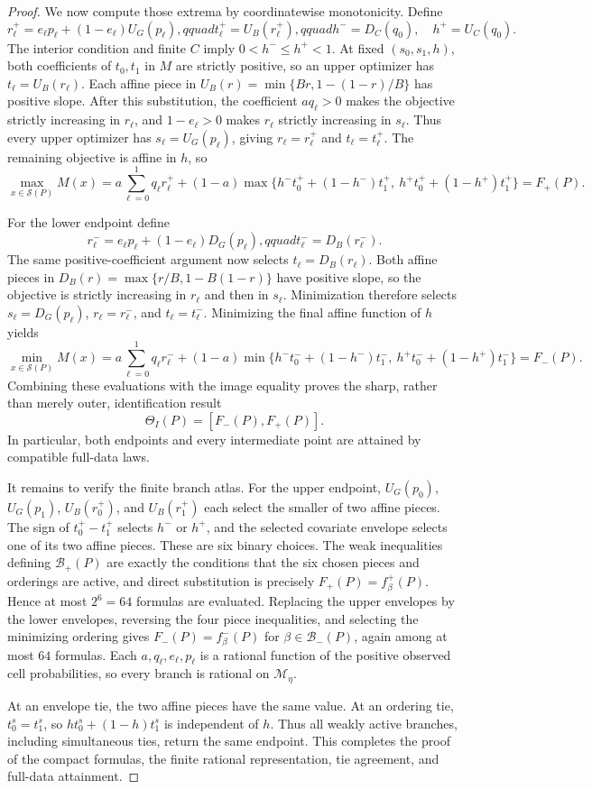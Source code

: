\documentclass{article}
\begin{document}
\begin{proof}
We now compute those extrema by coordinatewise monotonicity. Define
\[
r_\ell^+=e_\ell p_\ell+(1-e_\ell)U_G(p_\ell),qquad
t_\ell^+=U_B(r_\ell^+),qquad
h^-=D_C(q_0),\quad h^+=U_C(q_0).
\]
The interior condition and finite \(C\) imply \(0<h^-\leq h^+<1\). At fixed \((s_0,s_1,h)\), both coefficients of \(t_0,t_1\) in \(M\) are strictly positive, so an upper optimizer has \(t_\ell=U_B(r_\ell)\). Each affine piece in \(U_B(r)=\min\{Br,1-(1-r)/B\}\) has positive slope. After this substitution, the coefficient \(a q_\ell>0\) makes the objective strictly increasing in \(r_\ell\), and \(1-e_\ell>0\) makes \(r_\ell\) strictly increasing in \(s_\ell\). Thus every upper optimizer has \(s_\ell=U_G(p_\ell)\), giving \(r_\ell=r_\ell^+\) and \(t_\ell=t_\ell^+\). The remaining objective is affine in \(h\), so
\[
\max_{x\in\mathcal S(P)}M(x)
=a\sum_{\ell=0}^1q_\ell r_\ell^+
 +(1-a)\max\{h^-t_0^++(1-h^-)t_1^+,\ h^+t_0^++(1-h^+)t_1^+\}
=F_+(P).
\]

For the lower endpoint define
\[
r_\ell^-=e_\ell p_\ell+(1-e_\ell)D_G(p_\ell),qquad
t_\ell^-=D_B(r_\ell^-).
\]
The same positive-coefficient argument now selects \(t_\ell=D_B(r_\ell)\). Both affine pieces in \(D_B(r)=\max\{r/B,1-B(1-r)\}\) have positive slope, so the objective is strictly increasing in \(r_\ell\) and then in \(s_\ell\). Minimization therefore selects \(s_\ell=D_G(p_\ell)\), \(r_\ell=r_\ell^-\), and \(t_\ell=t_\ell^-\). Minimizing the final affine function of \(h\) yields
\[
\min_{x\in\mathcal S(P)}M(x)
=a\sum_{\ell=0}^1q_\ell r_\ell^-
 +(1-a)\min\{h^-t_0^-+(1-h^-)t_1^-,\ h^+t_0^-+(1-h^+)t_1^-\}
=F_-(P).
\]
Combining these evaluations with the image equality proves the sharp, rather than merely outer, identification result
\[
\Theta_I(P)=[F_-(P),F_+(P)].
\]
In particular, both endpoints and every intermediate point are attained by compatible full-data laws.

It remains to verify the finite branch atlas. For the upper endpoint, \(U_G(p_0)\), \(U_G(p_1)\), \(U_B(r_0^+)\), and \(U_B(r_1^+)\) each select the smaller of two affine pieces. The sign of \(t_0^+-t_1^+\) selects \(h^-\) or \(h^+\), and the selected covariate envelope selects one of its two affine pieces. These are six binary choices. The weak inequalities defining \(\mathcal B_+(P)\) are exactly the conditions that the six chosen pieces and orderings are active, and direct substitution is precisely \(F_+(P)=f_\beta^+(P)\). Hence at most \(2^6=64\) formulas are evaluated. Replacing the upper envelopes by the lower envelopes, reversing the four piece inequalities, and selecting the minimizing ordering gives \(F_-(P)=f_\beta^-(P)\) for \(\beta\in\mathcal B_-(P)\), again among at most \(64\) formulas. Each \(a,q_\ell,e_\ell,p_\ell\) is a rational function of the positive observed cell probabilities, so every branch is rational on \(\mathcal M_\eta\).

At an envelope tie, the two affine pieces have the same value. At an ordering tie, \(t_0^s=t_1^s\), so \(h t_0^s+(1-h)t_1^s\) is independent of \(h\). Thus all weakly active branches, including simultaneous ties, return the same endpoint. This completes the proof of the compact formulas, the finite rational representation, tie agreement, and full-data attainment.
\end{proof}
\end{document}
